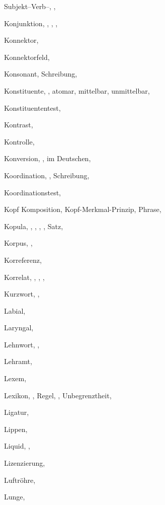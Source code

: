 \begin{theindex}
    \subitem Subjekt--Verb--, , 
  \item Konjunktion, , , , 
  \item Konnektor, 
  \item Konnektorfeld, 
  \item Konsonant, 
    \subitem Schreibung, 
  \item Konstituente, , 
    \subitem atomar, 
    \subitem mittelbar, 
    \subitem unmittelbar, 
  \item Konstituententest, 
  \item Kontrast, 
  \item Kontrolle, 
  \item Konversion, , 
    \subitem im Deutschen, 
  \item Koordination, , 
    \subitem Schreibung, 
  \item Koordinationstest, 
  \item Kopf
    \subitem Komposition, 
    \subitem Kopf-Merkmal-Prinzip, 
    \subitem Phrase, 
  \item Kopula, , , , 
		, 
    \subitem Satz, 
  \item Korpus, , 
  \item Korreferenz, 
  \item Korrelat, , , , 
  \item Kurzwort, , 

  \indexspace

  \item Labial, 
  \item Laryngal, 
  \item Lehnwort, , 
  \item Lehramt, 
  \item Lexem, 
  \item Lexikon, , 
    \subitem Regel, , 
    \subitem Unbegrenztheit, 
  \item Ligatur, 
  \item Lippen, 
  \item Liquid, , 
  \item Lizenzierung, 
  \item Luftröhre, 
  \item Lunge, 


\end{theindex}
